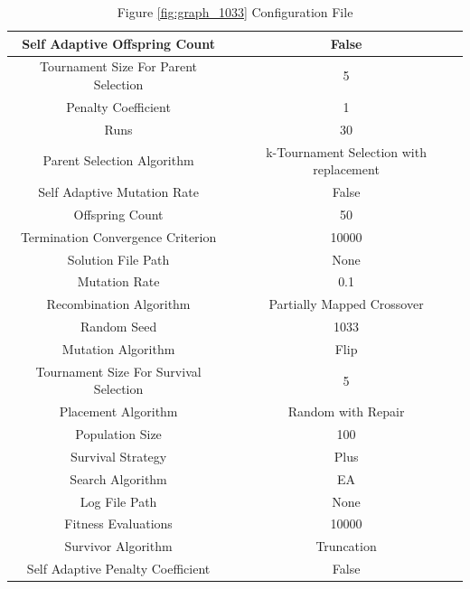 \documentclass{standalone}
\begin{document}
\begin{table}[!htb]
	\centering
	\caption{Figure \ref{fig:graph_1033} Configuration File}
	\label{tab:graph_1033}
	\begin{tabular}{| c | c |}
		\hline
		Self Adaptive Offspring Count		& False		 \\
		\hline
		Tournament Size For Parent Selection		& 5		 \\
		\hline
		Penalty Coefficient		& 1		 \\
		\hline
		Runs		& 30		 \\
		\hline
		Parent Selection Algorithm		& k-Tournament Selection with replacement		 \\
		\hline
		Self Adaptive Mutation Rate		& False		 \\
		\hline
		Offspring Count		& 50		 \\
		\hline
		Termination Convergence Criterion		& 10000		 \\
		\hline
		Solution File Path		& None		 \\
		\hline
		Mutation Rate		& 0.1		 \\
		\hline
		Recombination Algorithm		& Partially Mapped Crossover		 \\
		\hline
		Random Seed		& 1033		 \\
		\hline
		Mutation Algorithm		& Flip		 \\
		\hline
		Tournament Size For Survival Selection		& 5		 \\
		\hline
		Placement Algorithm		& Random with Repair		 \\
		\hline
		Population Size		& 100		 \\
		\hline
		Survival Strategy		& Plus		 \\
		\hline
		Search Algorithm		& EA		 \\
		\hline
		Log File Path		& None		 \\
		\hline
		Fitness Evaluations		& 10000		 \\
		\hline
		Survivor Algorithm		& Truncation		 \\
		\hline
		Self Adaptive Penalty Coefficient		& False		 \\
		\hline
	\end{tabular}
\end{table}
\end{document}
